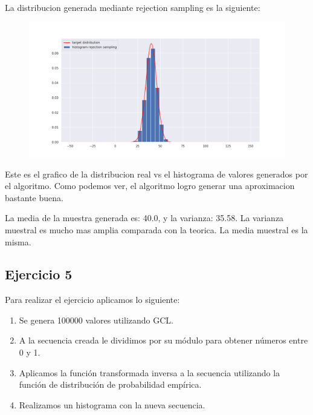 \documentclass[11pt,a4paper]{article}
\begin{document}
	La distribucion generada mediante rejection sampling es la siguiente:
	\begin{figure}[H]
  			\centering
    			\includegraphics[width=14cm]{imagenes/rejection_sampling_generated_distribution}
	\end{figure}

	Este es el grafico de la distribucion real vs el histograma de valores generados por el algoritmo. 
	Como podemos ver, el algoritmo logro generar una aproximacion bastante buena. 

	La media de la muestra generada es: 40.0, y la varianza: 35.58.\newline
	La varianza muestral es mucho mas amplia comparada con la teorica. La media muestral es la misma.

	\subsection{Ejercicio 5}
	    Para realizar el ejercicio aplicamos lo siguiente:
	    \begin{enumerate}
	        \item Se genera 100000 valores utilizando GCL.
	        \item A la secuencia creada le dividimos por su módulo para obtener números entre 0 y 1.
	        \item Aplicamos la función transformada inversa a la secuencia utilizando la función de distribución de probabilidad empírica.
	        \item Realizamos un histograma con la nueva secuencia.
	    \end{enumerate}
	
\end{document}
